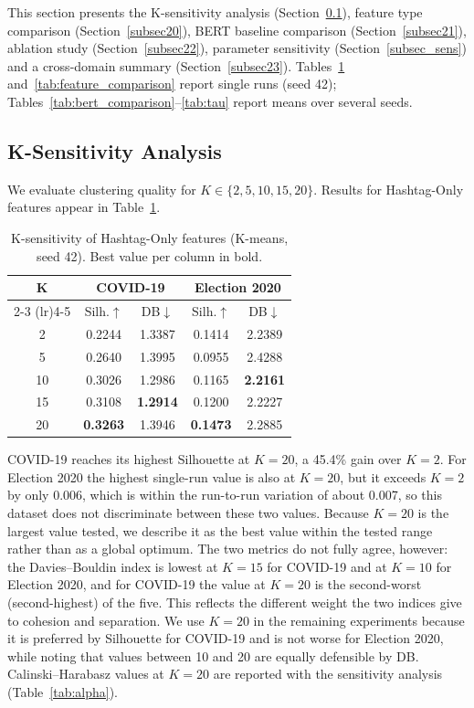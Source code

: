 \documentclass[pdflatex,sn-mathphys-num]{sn-jnl}%
\begin{document}
This section presents the K-sensitivity analysis (Section~\ref{subsec19}), feature type comparison (Section~\ref{subsec20}), BERT baseline comparison (Section~\ref{subsec21}), ablation study (Section~\ref{subsec22}), parameter sensitivity (Section~\ref{subsec_sens}) and a cross-domain summary (Section~\ref{subsec23}). Tables~\ref{tab:k_sensitivity} and~\ref{tab:feature_comparison} report single runs (seed 42); Tables~\ref{tab:bert_comparison}--\ref{tab:tau} report means over several seeds.

\subsection{K-Sensitivity Analysis}\label{subsec19}

We evaluate clustering quality for $K \in \{2, 5, 10, 15, 20\}$. Results for Hashtag-Only features appear in Table~\ref{tab:k_sensitivity}.

\begin{table}[t]
\centering
\caption{K-sensitivity of Hashtag-Only features (K-means, seed 42). Best value per column in bold.}
\label{tab:k_sensitivity}
\begin{tabular}{ccccc}
\toprule
\multirow{2}{*}{K} & \multicolumn{2}{c}{COVID-19} & \multicolumn{2}{c}{Election 2020} \\
\cmidrule(lr){2-3} \cmidrule(lr){4-5}
 & Silh.$\uparrow$ & DB$\downarrow$ & Silh.$\uparrow$ & DB$\downarrow$ \\
\midrule
2  & 0.2244 & 1.3387 & 0.1414 & 2.2389 \\
5  & 0.2640 & 1.3995 & 0.0955 & 2.4288 \\
10 & 0.3026 & 1.2986 & 0.1165 & \textbf{2.2161} \\
15 & 0.3108 & \textbf{1.2914} & 0.1200 & 2.2227 \\
20 & \textbf{0.3263} & 1.3946 & \textbf{0.1473} & 2.2885 \\
\bottomrule
\end{tabular}
\end{table}

COVID-19 reaches its highest Silhouette at $K=20$, a 45.4\% gain over $K=2$. For Election 2020 the highest single-run value is also at $K=20$, but it exceeds $K=2$ by only 0.006, which is within the run-to-run variation of about 0.007, so this dataset does not discriminate between these two values. Because $K=20$ is the largest value tested, we describe it as the best value within the tested range rather than as a global optimum. The two metrics do not fully agree, however: the Davies--Bouldin index is lowest at $K=15$ for COVID-19 and at $K=10$ for Election 2020, and for COVID-19 the value at $K=20$ is the second-worst (second-highest) of the five. This reflects the different weight the two indices give to cohesion and separation. We use $K=20$ in the remaining experiments because it is preferred by Silhouette for COVID-19 and is not worse for Election 2020, while noting that values between 10 and 20 are equally defensible by DB. Calinski--Harabasz values at $K=20$ are reported with the sensitivity analysis (Table~\ref{tab:alpha}).
\end{document}
